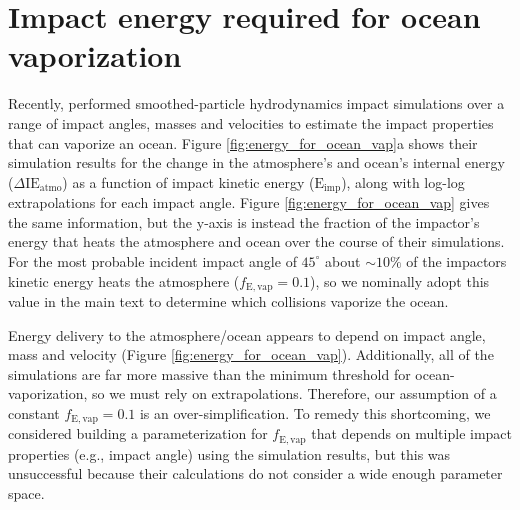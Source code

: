 \documentclass[manuscript]{aastex63}
\begin{document}
\section{Impact energy required for ocean vaporization} \label{sec:append_vap}

Recently, \citet{Citron_2022} performed smoothed-particle hydrodynamics impact simulations over a range of impact angles, masses and velocities to estimate the impact properties that can vaporize an ocean. Figure \ref{fig:energy_for_ocean_vap}a shows their simulation results for the change in the atmosphere's and ocean's internal energy ($\Delta \mathrm{IE}_\mathrm{atmo}$) as a function of impact kinetic energy ($\mathrm{E}_\mathrm{imp}$), along with log-log extrapolations for each impact angle. Figure \ref{fig:energy_for_ocean_vap} gives the same information, but the y-axis is instead the fraction of the impactor's energy that heats the atmosphere and ocean over the course of their simulations. For the most probable incident impact angle of $45^\circ$ about $\sim 10\%$ of the impactors kinetic energy heats the atmosphere ($f_\mathrm{E,vap} = 0.1$), so we nominally adopt this value in the main text to determine which collisions vaporize the ocean.

Energy delivery to the atmosphere/ocean appears to depend on impact angle, mass and velocity (Figure \ref{fig:energy_for_ocean_vap}). Additionally, all of the \citet{Citron_2022} simulations are far more massive than the minimum threshold for ocean-vaporization, so we must rely on extrapolations. Therefore, our assumption of a constant $f_\mathrm{E,vap} = 0.1$ is an over-simplification. To remedy this shortcoming, we considered building a parameterization for $f_\mathrm{E,vap}$ that depends on multiple impact properties (e.g., impact angle) using the \citet{Citron_2022} simulation results, but this was unsuccessful because their calculations do not consider a wide enough parameter space.
\end{document}
